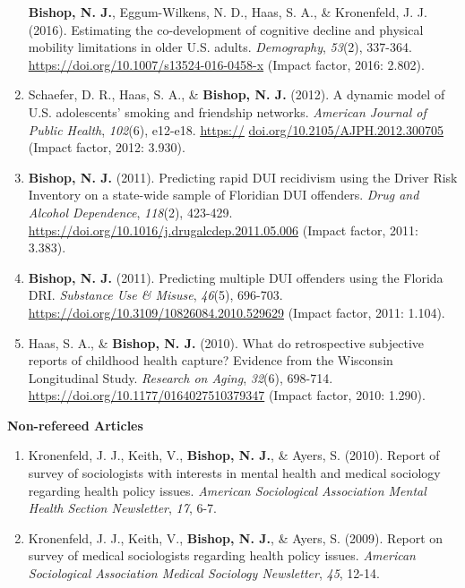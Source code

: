 \documentclass[
]{article}
\begin{document}
\begin{enumerate}
  \textbf{Bishop, N. J.}, Eggum-Wilkens, N. D., Haas, S. A., \&
  Kronenfeld, J. J. (2016). Estimating the co-development of cognitive
  decline and physical mobility limitations in older U.S. adults.
  \emph{Demography}, \emph{53}(2), 337-364.
  \url{https://doi.org/10.1007/s13524-016-0458-x} (Impact factor, 2016:
  2.802).
\item
  Schaefer, D. R., Haas, S. A., \& \textbf{Bishop, N. J.} (2012). A
  dynamic model of U.S. adolescents' smoking and friendship networks.
  \emph{American Journal of Public Health}, \emph{102}(6), e12-e18.
  \href{https://}{\ul{https://}}
  \href{https://doi.org/10.2105/AJPH.2012.300705}{doi.org/10.2105/AJPH.2012.300705}
  (Impact factor, 2012: 3.930).
\item
  \textbf{Bishop, N. J.} (2011). Predicting rapid DUI recidivism using
  the Driver Risk Inventory on a state-wide sample of Floridian DUI
  offenders. \emph{Drug and Alcohol Dependence}, \emph{118}(2), 423-429.
  \url{https://doi.org/10.1016/j.drugalcdep.2011.05.006} (Impact factor,
  2011: 3.383).
\item
  \textbf{Bishop, N. J.} (2011). Predicting multiple DUI offenders using
  the Florida DRI. \emph{Substance Use \& Misuse}, \emph{46}(5),
  696-703. \url{https://doi.org/10.3109/10826084.2010.529629} (Impact
  factor, 2011: 1.104).
\item
  Haas, S. A., \& \textbf{Bishop, N. J.} (2010). What do retrospective
  subjective reports of childhood health capture? Evidence from the
  Wisconsin Longitudinal Study. \emph{Research on Aging}, \emph{32}(6),
  698-714. \url{https://doi.org/10.1177/0164027510379347} (Impact
  factor, 2010: 1.290).
\end{enumerate}

\textbf{Non-refereed Articles}

\begin{enumerate}
\def\labelenumi{\arabic{enumi}.}
\item
  Kronenfeld, J. J., Keith, V., \textbf{Bishop, N. J.}, \& Ayers, S.
  (2010). Report of survey of sociologists with interests in mental
  health and medical sociology regarding health policy issues.
  \emph{American Sociological Association Mental Health Section
  Newsletter}, \emph{17}, 6-7.
\item
  Kronenfeld, J. J., Keith, V., \textbf{Bishop, N. J.}, \& Ayers, S.
  (2009). Report on survey of medical sociologists regarding health
  policy issues. \emph{American Sociological Association Medical
  Sociology Newsletter}, \emph{45}, 12-14.
\end{enumerate}
\end{document}
